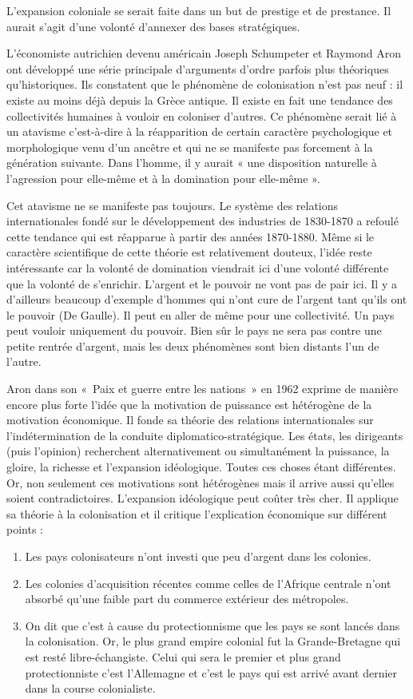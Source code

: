 \documentclass[12pt]{report}
\begin{document}
L’expansion coloniale se serait faite dans un but de prestige et de prestance. Il aurait s’agit
d’une volonté d’annexer des bases stratégiques.

L’économiste autrichien devenu américain Joseph Schumpeter et Raymond Aron ont
développé une série principale d’arguments d’ordre parfois plus théoriques qu’historiques. Ils
constatent que le phénomène de colonisation n’est pas neuf : il existe au moins déjà depuis la
Grèce antique. Il existe en fait une tendance des collectivités humaines à vouloir en coloniser
d’autres. Ce phénomène serait lié à un atavisme c’est-à-dire à la réapparition de certain
caractère psychologique et morphologique venu d’un ancêtre et qui ne se manifeste pas
forcement à la génération suivante. Dans l’homme, il y aurait « une disposition naturelle à
l’agression pour elle-même et à la domination pour elle-même ».

Cet atavisme ne se manifeste pas toujours. Le système des relations internationales fondé sur
le développement des industries de 1830-1870 a refoulé cette tendance qui est réapparue à
partir des années 1870-1880. Même si le caractère scientifique de cette théorie est
relativement douteux, l’idée reste intéressante car la volonté de domination viendrait ici d’une
volonté différente que la volonté de s’enrichir. L’argent et le pouvoir ne vont pas de pair ici. Il
y a d’ailleurs beaucoup d’exemple d’hommes qui n’ont cure de l’argent tant qu’ils ont le
pouvoir (De Gaulle). Il peut en aller de même pour une collectivité. Un pays peut vouloir
uniquement du pouvoir. Bien sûr le pays ne sera pas contre une petite rentrée d’argent, mais
les deux phénomènes sont bien distants l’un de l’autre.

Aron dans son «~Paix et guerre entre les nations~» en 1962 exprime de manière encore plus
forte l’idée que la motivation de puissance est hétérogène de la motivation économique. Il
fonde sa théorie des relations internationales sur l’indétermination de la conduite diplomatico-stratégique. Les états, les dirigeants (puis l'opinion) recherchent alternativement ou simultanément la
puissance, la gloire, la richesse et l’expansion idéologique. Toutes ces choses étant
différentes. Or, non seulement ces motivations sont hétérogènes mais il arrive aussi qu’elles
soient contradictoires. L’expansion idéologique peut coûter très cher. Il applique sa théorie à
la colonisation et il critique l’explication économique sur différent points :

\begin{enumerate}
	\item Les pays colonisateurs n'ont investi que peu d'argent dans les colonies.
	\item Les colonies d'acquisition récentes comme celles de l'Afrique centrale n'ont absorbé qu'une faible part du commerce extérieur des métropoles.
	\item On dit que c'est à cause du protectionnisme que les pays se sont lancés dans la colonisation. Or, le plus grand empire colonial fut la Grande-Bretagne qui est resté libre-échangiste. Celui qui sera le premier et plus grand protectionniste c’est l’Allemagne et c’est le pays qui est arrivé avant dernier dans la course colonialiste.
\end{enumerate}
\end{document}
